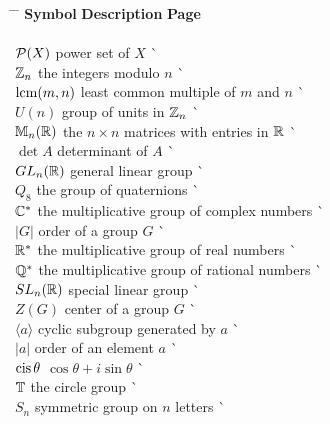 \begin{tabbing}
\hspace{1.5in} \= \hspace{2.5in} \= \kill     
{\bf Symbol}  \> {\bf Description} \>  \` {\bf Page} \\ 
     \mbox{\hspace*{1in}} \\
${\cal P}(X)$ \> power set of $X$ \> \` \pageref{powerset} \\
${\Bbb Z}_n$ \> the integers modulo $n$ \> \` \pageref{integersmodn} \\
$\operatorname{lcm}(m,n)$ \> least common multiple of $m$ and $n$ \>
     \` \pageref{leastcm} \\
$U(n)$ \> group of units in ${\Bbb Z}_n$ \> \` \pageref{groupofunits} \\
${\Bbb M}_n ( {\Bbb R})$ \> the $n \times n$ matrices with entries in
     ${\Bbb R}$ \> \`  \pageref{notematrices} \\
$\det A$ \> determinant of $A$ \> \` \pageref{determinant} \\
$GL_n({\Bbb R})$ \> general linear group \> \` \pageref{generallinear} \\
$Q_8$ \> the group of quaternions \> \` \pageref{notequateriongroup} \\
${\Bbb C}^\ast$ \> the multiplicative group of complex numbers \>
     \` \pageref{noteCstar} \\
$|G|$ \> order of a group $G$ \> \` \pageref{noteorder} \\
${\Bbb R}^*$ \> the multiplicative group of real numbers \>
     \` \pageref{noteRstar} \\
${\Bbb Q}^*$ \> the multiplicative group of rational numbers \>
     \` \pageref{noteQstar} \\
$SL_n({\Bbb R})$ \> special linear group \> \` \pageref{speciallinear} \\
$Z(G)$ \> center of a group $G$ \> \` \pageref{centerofagroup} \\
$\langle a \rangle$ \> cyclic subgroup generated by $a$ \>
     \` \pageref{generatedby} \\  
$|a|$ \> order of an element $a$ \> \`
     \pageref{noteelementorder} \\
$\operatorname{cis} \theta$ \> $\cos \theta + i \sin \theta$ \> 
     \` \pageref{cosisin} \\
${\Bbb T}$ \> the circle group \> \` \pageref{notecirclegroup} \\
$S_n$ \> symmetric group on $n$ letters \> 
     \` \pageref{symmetricgroup} \\

\end{tabbing}
